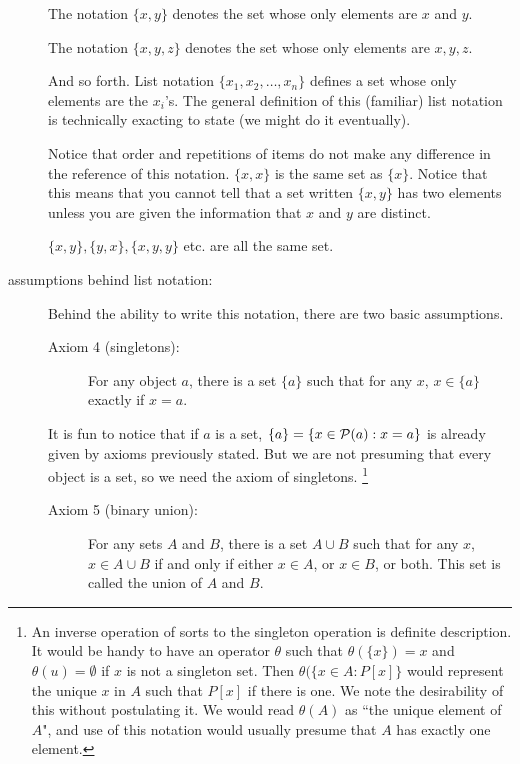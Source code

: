 \documentclass[12pt]{article}
\begin{document}
\begin{description}
The notation $\{x,y\}$ denotes the set whose only elements are $x$ and $y$.

The notation $\{x,y,z\}$ denotes the set whose only elements are $x,y,z$.

And so forth.  List notation $\{x_1,x_2,\ldots,x_n\}$ defines a set whose only elements are the $x_i$'s.
The general definition of this (familiar) list notation is technically exacting to state (we might do it eventually).

Notice that order and repetitions of items do not make any difference in the reference of this notation.
$\{x,x\}$ is the same set as $\{x\}$.  Notice that this means that you cannot tell that a set written $\{x,y\}$ has two elements unless you are given the information that $x$ and $y$ are distinct.

$\{x,y\}, \{y,x\}, \{x,y,y\}$ etc. are all the same set.

\item[assumptions behind list notation:]

Behind the ability to write this notation, there are two basic assumptions.

\begin{description}

\item[Axiom 4 (singletons):]  For any object $a$, there is a set $\{a\}$ such that for any $x$, $x \in \{a\}$ exactly if $x=a$.

\end{description}

It is fun to notice that if $a$ is a set, $\{a\} = \{x \in {\cal P}(a):x=a\}$ is already given by axioms previously stated.
But we are not presuming that every object is a set, so we need the axiom of singletons. \footnote{An inverse operation of sorts to the singleton operation is definite description.  It would be handy to have an operator
$\theta$ such that $\theta(\{x\}) = x$ and $\theta(u) = \emptyset$ if $x$ is not a singleton set.  Then $\theta(\{x \in A:P[x]\}$ would represent the unique $x$ in $A$ such that $P[x]$ if there is one.   We note the desirability of this without postulating it.  We would read $\theta(A)$ as ``the unique element of $A$", and use of this notation would usually presume
that $A$ has exactly one element.}

\begin{description}
\item[Axiom 5 (binary union):]  For any sets $A$ and $B$, there is a set $A \cup B$ such that for any $x$, $x \in A \cup B$ if and only if 
either $x \in A$, or $x \in B$, or both.  This set is called the union of $A$ and $B$.
\end{description}


\end{description}
\end{document}
